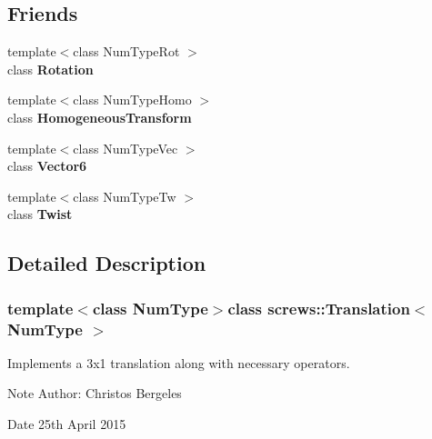 \subsection*{Friends}
\begin{DoxyCompactItemize}
\item 
\hypertarget{singletonscrews_1_1_translation_a71cdfb2347f288c41e58374b57613143}{{\footnotesize template$<$class Num\+Type\+Rot $>$ }\\class {\bfseries Rotation}}\label{singletonscrews_1_1_translation_a71cdfb2347f288c41e58374b57613143}

\item 
\hypertarget{singletonscrews_1_1_translation_a64349d960cc83b80013641015f37b1a8}{{\footnotesize template$<$class Num\+Type\+Homo $>$ }\\class {\bfseries Homogeneous\+Transform}}\label{singletonscrews_1_1_translation_a64349d960cc83b80013641015f37b1a8}

\item 
\hypertarget{singletonscrews_1_1_translation_a7f74028c028d4b5013af0bf9224bb43e}{{\footnotesize template$<$class Num\+Type\+Vec $>$ }\\class {\bfseries Vector6}}\label{singletonscrews_1_1_translation_a7f74028c028d4b5013af0bf9224bb43e}

\item 
\hypertarget{singletonscrews_1_1_translation_a90f9fa90695f35a9b08d0e888ea4297e}{{\footnotesize template$<$class Num\+Type\+Tw $>$ }\\class {\bfseries Twist}}\label{singletonscrews_1_1_translation_a90f9fa90695f35a9b08d0e888ea4297e}

\end{DoxyCompactItemize}


\subsection{Detailed Description}
\subsubsection*{template$<$class Num\+Type$>$class screws\+::\+Translation$<$ Num\+Type $>$}

Implements a 3x1 translation along with necessary operators. 

\begin{DoxyNote}{Note}
Author\+: Christos Bergeles 
\end{DoxyNote}
\begin{DoxyDate}{Date}
25th April 2015 
\end{DoxyDate}


